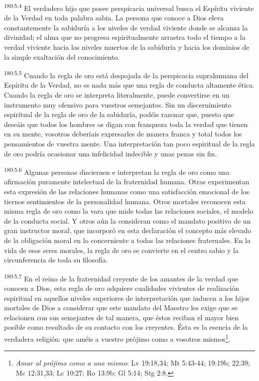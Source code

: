 \par 
\textsuperscript{180:5.4} El verdadero hijo que posee perspicacia universal busca el Espíritu viviente de la Verdad en toda palabra sabia. La persona que conoce a Dios eleva constantemente la sabiduría a los niveles de verdad viviente donde se alcanza la divinidad; el alma que no progresa espiritualmente arrastra todo el tiempo a la verdad viviente hacia los niveles muertos de la sabiduría y hacia los dominios de la simple exaltación del conocimiento.

\par 
\textsuperscript{180:5.5} Cuando la regla de oro está despojada de la perspicacia suprahumana del Espíritu de la Verdad, no es nada más que una regla de conducta altamente ética. Cuando la regla de oro se interpreta literalmente, puede convertirse en un instrumento muy ofensivo para vuestros semejantes. Sin un discernimiento espiritual de la regla de oro de la sabiduría, podéis razonar que, puesto que deseáis que todos los hombres os digan con franqueza toda la verdad que tienen en su mente, vosotros deberíais expresarles de manera franca y total todos los pensamientos de vuestra mente. Una interpretación tan poco espiritual de la regla de oro podría ocasionar una infelicidad indecible y unas penas sin fin.

\par 
\textsuperscript{180:5.6} Algunas personas disciernen e interpretan la regla de oro como una afirmación puramente intelectual de la fraternidad humana. Otras experimentan esta expresión de las relaciones humanas como una satisfacción emocional de los tiernos sentimientos de la personalidad humana. Otros mortales reconocen esta misma regla de oro como la vara que mide todas las relaciones sociales, el modelo de la conducta social. Y otros aún la consideran como el mandato positivo de un gran instructor moral, que incorporó en esta declaración el concepto más elevado de la obligación moral en lo concerniente a todas las relaciones fraternales. En la vida de esos seres morales, la regla de oro se convierte en el centro sabio y la circunferencia de toda su filosofía.

\par 
\textsuperscript{180:5.7} En el reino de la fraternidad creyente de los amantes de la verdad que conocen a Dios, esta regla de oro adquiere cualidades vivientes de realización espiritual en aquellos niveles superiores de interpretación que inducen a los hijos mortales de Dios a considerar que este mandato del Maestro les exige que se relacionen con sus semejantes de tal manera, que éstos reciban el mayor bien posible como resultado de su contacto con los creyentes. Ésta es la esencia de la verdadera religión: que améis a vuestro prójimo como a vosotros mismos\footnote{\textit{Amar al prójimo como a uno mismo}: Lv 19:18,34; Mt 5:43-44; 19:19b; 22:39; Mc 12:31,33; Lc 10:27; Ro 13:9b; Gl 5:14; Stg 2:8.}.

